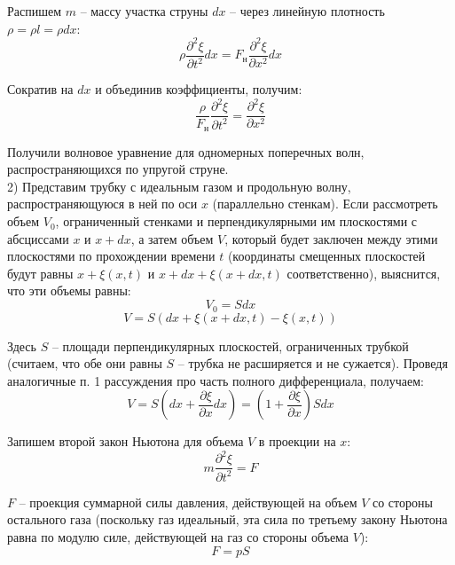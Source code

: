\documentclass{article}
\begin{document}
	Распишем $m$ -- массу участка струны $dx$ -- через линейную плотность $\rho = \rho l = \rho dx$:
	\begin{equation}
		\rho \frac{\partial^2 \xi}{\partial t^2} dx = F_\text{н}\frac{\partial^2 \xi}{\partial x^2}dx
	\end{equation}

	Сократив на $dx$ и объединив коэффициенты, получим:
	\begin{equation}
		\frac{\rho}{F_\text{н}} \frac{\partial^2 \xi}{\partial t^2} = \frac{\partial^2 \xi}{\partial x^2}
	\end{equation}

	Получили волновое уравнение для одномерных поперечных волн, распространяющихся по упругой струне.\\

	2) Представим трубку с идеальным газом и продольную волну, распространяющуюся в ней по оси $x$ (параллельно стенкам). Если рассмотреть объем $V_0$, ограниченный стенками и перпендикулярными им плоскостями с абсциссами $x$ и $x+dx$, а затем объем $V$, который будет заключен между этими плоскостями по прохождении времени $t$ (координаты смещенных плоскостей будут равны $x+\xi(x,t)$ и $x+dx+\xi(x+dx,t)$ соответственно), выяснится, что эти объемы равны:
	\begin{equation}
		V_0 = Sdx
	\end{equation}
	\begin{equation}
		V = S(dx + \xi(x+dx,t) - \xi(x,t))
	\end{equation}

	Здесь $S$ -- площади перпендикулярных плоскостей, ограниченных трубкой (считаем, что обе они равны $S$ -- трубка не расширяется и не сужается). Проведя аналогичные п. 1 рассуждения про часть полного дифференциала, получаем:
	\begin{equation}
		V = S(dx + \frac{\partial \xi}{\partial x}dx) = (1+\frac{\partial \xi}{\partial x})Sdx
	\end{equation}

	Запишем второй закон Ньютона для объема $V$ в проекции на $x$:
	\begin{equation}
		m\frac{\partial^2\xi}{\partial t^2} = F
	\end{equation}

	$F$ -- проекция суммарной силы давления, действующей на объем $V$ со стороны остального газа (поскольку газ идеальный, эта сила по третьему закону Ньютона равна по модулю силе, действующей на газ со стороны объема $V$):
	\begin{equation}
		F = pS
	\end{equation}
\end{document}
